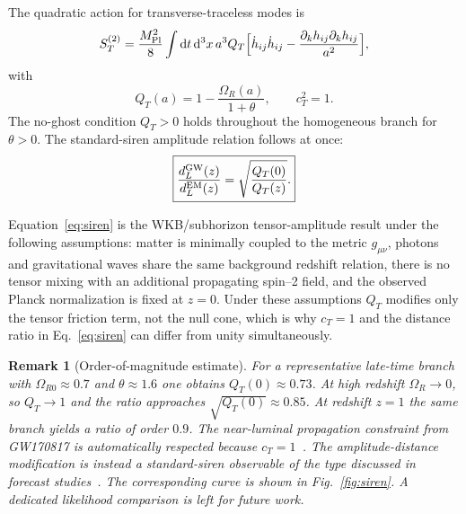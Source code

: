 \documentclass[11pt,a4paper]{article}
\newtheorem{remark}[axiom]{Remark}
\renewcommand{\dd}{\mathrm{d}}
\newcommand{\mpl}{M_{\rm Pl}}
\newcommand{\Boxed}[1]{\boxed{\displaystyle #1}}
\begin{document}
The quadratic action for transverse-traceless modes is
\begin{equation}
S_T^{(2)}=\frac{\mpl^2}{8}\int\dd t\,\dd^3x\,a^3Q_T\Bigl[\dot h_{ij}\dot h_{ij}-\frac{\partial_k h_{ij}\partial_k h_{ij}}{a^2}\Bigr],
\end{equation}
with
\[
\Boxed{Q_T(a)=1-\frac{\Omega_R(a)}{1+\theta},\qquad c_T^2=1.}
\]
The no-ghost condition \(Q_T>0\) holds throughout the homogeneous branch for \(\theta>0\). The standard-siren amplitude relation follows at once:
\begin{equation}
\Boxed{\frac{d_L^{\rm GW}(z)}{d_L^{\rm EM}(z)}=\sqrt{\frac{Q_T(0)}{Q_T(z)}}.}
\label{eq:siren}
\end{equation}

Equation~\eqref{eq:siren} is the WKB/subhorizon tensor-amplitude result under the following assumptions: matter is minimally coupled to the metric \(g_{\mu\nu}\), photons and gravitational waves share the same background redshift relation, there is no tensor mixing with an additional propagating spin--2 field, and the observed Planck normalization is fixed at \(z=0\). Under these assumptions \(Q_T\) modifies only the tensor friction term, not the null cone, which is why \(c_T=1\) and the distance ratio in Eq.~\eqref{eq:siren} can differ from unity simultaneously.

\begin{remark}[Order-of-magnitude estimate]
For a representative late-time branch with \(\Omega_{R0}\approx0.7\) and \(\theta\approx1.6\) one obtains \(Q_T(0)\approx0.73\). At high redshift \(\Omega_R\to0\), so \(Q_T\to1\) and the ratio approaches \(\sqrt{Q_T(0)}\approx0.85\). At redshift \(z=1\) the same branch yields a ratio of order \(0.9\). The near-luminal propagation constraint from GW170817 is automatically respected because \(c_T=1\)~\cite{GW170817}. The amplitude-distance modification is instead a standard-siren observable of the type discussed in forecast studies~\cite{Belgacem}. The corresponding curve is shown in Fig.~\ref{fig:siren}. A dedicated likelihood comparison is left for future work.
\end{remark}
\end{document}
